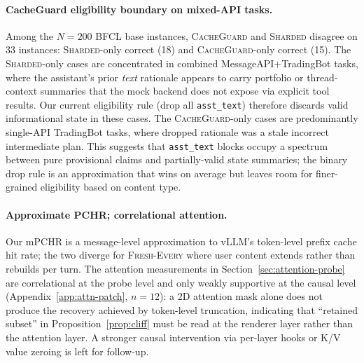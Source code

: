 \documentclass{article}
\begin{document}
\paragraph{CacheGuard eligibility boundary on mixed-API tasks.}
Among the $N=200$ BFCL base instances, \textsc{CacheGuard} and \textsc{Sharded} disagree on 33 instances: \textsc{Sharded}-only correct (18) and \textsc{CacheGuard}-only correct (15). The \textsc{Sharded}-only cases are concentrated in combined MessageAPI$+$TradingBot tasks, where the assistant's prior \textit{text} rationale appears to carry portfolio or thread-context summaries that the mock backend does not expose via explicit tool results. Our current eligibility rule (drop all \texttt{asst\_text}) therefore discards valid informational state in these cases. The \textsc{CacheGuard}-only cases are predominantly single-API TradingBot tasks, where dropped rationale was a stale incorrect intermediate plan. This suggests that \texttt{asst\_text} blocks occupy a spectrum between pure provisional claims and partially-valid state summaries; the binary drop rule is an approximation that wins on average but leaves room for finer-grained eligibility based on content type.

\paragraph{Approximate PCHR; correlational attention.}
Our mPCHR is a message-level approximation to vLLM's token-level prefix cache hit rate; the two diverge for \textsc{Fresh-Every} where user content extends rather than rebuilds per turn. The attention measurements in Section~\ref{sec:attention-probe} are correlational at the probe level and only weakly supportive at the causal level (Appendix~\ref{app:attn-patch}, $n=12$): a 2D attention mask alone does not produce the recovery achieved by token-level truncation, indicating that ``retained subset'' in Proposition~\ref{prop:cliff} must be read at the renderer layer rather than the attention layer. A stronger causal intervention via per-layer hooks or K/V value zeroing is left for follow-up.
\end{document}
